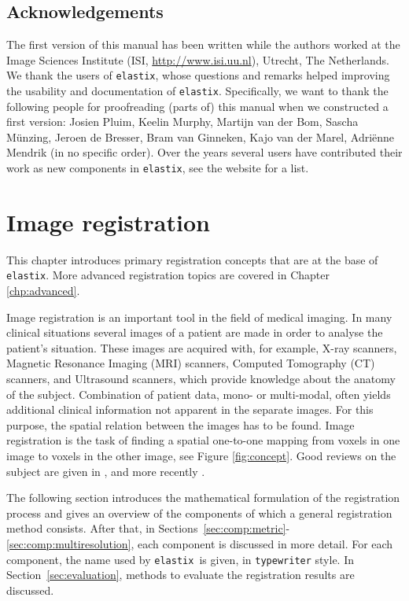 \documentclass[]{report}
\newcommand{\elastix}{\texttt{elastix}}
\begin{document}
\section{Acknowledgements}

The first version of this manual has been written while the authors
worked at the Image Sciences Institute (ISI,
\url{http://www.isi.uu.nl}), Utrecht, The Netherlands. We thank the
users of \elastix, whose questions and remarks helped improving the
usability and documentation of \elastix. Specifically, we want to
thank the following people for proofreading (parts of) this manual
when we constructed a first version: Josien Pluim, Keelin Murphy,
Martijn van der Bom, Sascha M\"{u}nzing, Jeroen de Bresser, Bram van
Ginneken, Kajo van der Marel, Adri\"{e}nne Mendrik (in no specific
order). Over the years several users have contributed their work as
new components in \elastix, see the website for a list.


\chapter{Image registration}\label{chp:Registration}

This chapter introduces primary registration concepts that are at
the base of \elastix. More advanced registration topics are covered
in Chapter \ref{chp:advanced}.

Image registration is an important tool in the field of medical
imaging. In many clinical situations several images of a patient are
made in order to analyse the patient's situation. These images are
acquired with, for example, X-ray scanners, Magnetic Resonance
Imaging (MRI) scanners, Computed Tomography (CT) scanners, and
Ultrasound scanners, which provide knowledge about the anatomy of
the subject. Combination of patient data, mono- or multi-modal,
often yields additional clinical information not apparent in the
separate images. For this purpose, the spatial relation between the
images has to be found. Image registration is the task of finding a
spatial one-to-one mapping from voxels in one image to voxels in the
other image, see Figure \ref{fig:concept}. Good reviews on the
subject are given in
\citet{MaintzEA98,LesterEA99,HillEA01,Hajnal01,Zit03:Image,
Modersitzki04:Numerical}, and more recently \cite{Sotiras2013}.

The following section introduces the mathematical formulation of
the registration process and gives an overview of the components
of which a general registration method consists. After that, in
Sections~\ref{sec:comp:metric}-\ref{sec:comp:multiresolution},
each component is discussed in more detail. For each component,
the name used by \elastix\ is given, in \texttt{typewriter} style.
In Section~\ref{sec:evaluation}, methods to evaluate the
registration results are discussed.
\end{document}
